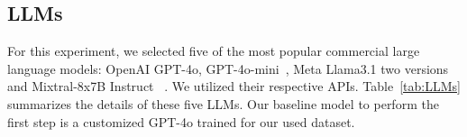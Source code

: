 





\subsection{LLMs} 

For this experiment, we selected five of the most popular commercial large language models: OpenAI GPT-4o, GPT-4o-mini~\cite{achiam2023gpt}, Meta Llama3.1 two versions~\cite{touvron2023llama} and Mixtral-8x7B Instruct~\cite{jiang2024mixtral} . We utilized their respective APIs. Table~\ref{tab:LLMs} summarizes the details of these five LLMs. Our baseline model to perform the first step is a customized GPT-4o trained for our used dataset.



